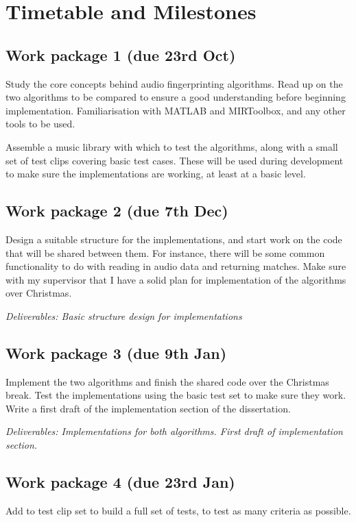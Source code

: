 \documentclass[12pt]{article}
\begin{document}
\newpage %

\section*{Timetable and Milestones}

\subsection*{Work package 1 (due 23rd Oct)}
Study the core concepts behind audio fingerprinting algorithms. Read up on the two algorithms to be compared to ensure a good understanding before beginning implementation. Familiarisation with MATLAB and MIRToolbox, and any other tools to be used.

Assemble a music library with which to test the algorithms, along with a small set of test clips covering basic test cases. These will be used during development to make sure the implementations are working, at least at a basic level.

\subsection*{Work package 2 (due 7th Dec)}
Design a suitable structure for the implementations, and start work on the code that will be shared between them. For instance, there will be some common functionality to do with reading in audio data and returning matches. Make sure with my supervisor that I have a solid plan for implementation of the algorithms over Christmas.

\emph{Deliverables: Basic structure design for implementations}

\subsection*{Work package 3 (due 9th Jan)}
Implement the two algorithms and finish the shared code over the Christmas break. Test the implementations using the basic test set to make sure they work. Write a first draft of the implementation section of the dissertation.

\emph{Deliverables: Implementations for both algorithms. First draft of implementation section.}

\subsection*{Work package 4 (due 23rd Jan)}
Add to test clip set to build a full set of tests, to test as many criteria as possible.
\end{document}
